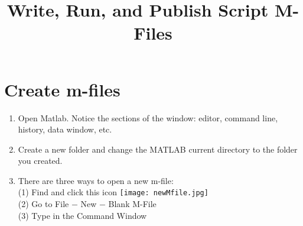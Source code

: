 \documentclass[12pt]{article}
\begin{document}
\title{Write, Run, and Publish Script M-Files}
\date{}
\maketitle

\section{Create m-files}
\begin{enumerate}
\item Open Matlab. Notice the sections of the window: editor, command line, history, data window, etc.

\item Create a new folder and change the MATLAB current directory to the folder you created.

\item There are three ways to open a new m-file:\\
(1) Find and click this icon \texttt{[image: newMfile.jpg]}\\
(2) Go to File $-$ New $-$ Blank M-File\\
(3) Type  in the Command Window%
\end{enumerate}

\end{document}
